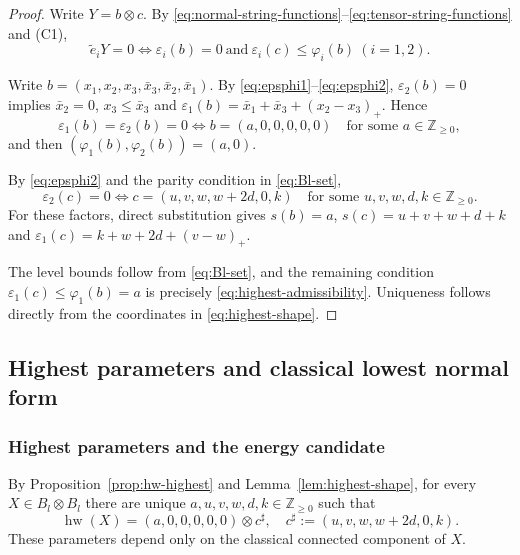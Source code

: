 \documentclass[11pt,reqno]{amsart}
\newcommand{\Zge}{\mathbb Z_{\ge 0}}
\newcommand{\hw}{\operatorname{hw}}
\numberwithin{table}{section}
\numberwithin{equation}{section}
\theoremstyle{plain}
\theoremstyle{definition}
\begin{document}
\begin{proof}
	Write \(Y=b\otimes c\).
	By \eqref{eq:normal-string-functions}--\eqref{eq:tensor-string-functions}  and \textup{(C1)},
	\[
	\widetilde e_iY=0
	\iff
	\varepsilon_i(b)=0
	\ \text{and}\
	\varepsilon_i(c)\le\varphi_i(b)
	\ (i=1,2).
	\]
	
	Write \(b=(x_1,x_2,x_3,\bar x_3,\bar x_2,\bar x_1)\).
	By \eqref{eq:epsphi1}--\eqref{eq:epsphi2},
	\(\varepsilon_2(b)=0\) implies $\bar x_2=0$, $x_3\le\bar x_3$ and $\varepsilon_1(b)
	=
	\bar x_1+\bar x_3+(x_2-x_3)_+$.
	Hence
	\[
	\varepsilon_1(b)=\varepsilon_2(b)=0
	\iff
	b=(a,0,0,0,0,0)
	\quad\text{for some }a\in\Zge,
	\]
	and then
	\((\varphi_1(b),\varphi_2(b))=(a,0)\).
	
	By \eqref{eq:epsphi2} and the parity condition in
	\eqref{eq:Bl-set},
	\[
	\varepsilon_2(c)=0
	\iff
	c=(u,v,w,w+2d,0,k)
	\quad\text{for some }u,v,w,d,k\in\Zge.
	\]
	For these factors, direct substitution gives $s(b)=a$, $s(c)=u+v+w+d+k$ and $\varepsilon_1(c)=k+w+2d+(v-w)_+$.

	The level bounds follow from \eqref{eq:Bl-set}, and the
	remaining condition
	\(\varepsilon_1(c)\le\varphi_1(b)=a\)
	is precisely \eqref{eq:highest-admissibility}.
	Uniqueness follows directly from the coordinates in
	\eqref{eq:highest-shape}.
\end{proof}

\subsection{Highest parameters and classical lowest normal form}

\subsubsection{Highest parameters and the energy candidate}

By Proposition~\ref{prop:hw-highest} and
Lemma~\ref{lem:highest-shape}, for every
\(X\in B_l\otimes B_l\) there are unique
\(a,u,v,w,d,k\in\Zge\) such that
\begin{equation}\label{eq:high-param}
	\hw(X)
	=
	(a,0,0,0,0,0)\otimes c^\sharp,
	\quad
	c^\sharp:=(u,v,w,w+2d,0,k).
\end{equation}
These parameters depend only on the classical connected component
of \(X\).
\end{document}
